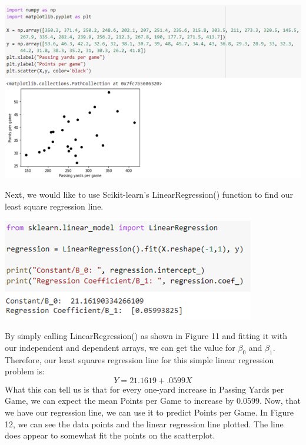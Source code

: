 \documentclass[a4paper,12pt]{report}
\begin{document}
\begin{center}
    \captionsetup{type=figure}
    \includegraphics[width=.9\linewidth]{media/scatterplotmatplot.png}
\end{center}

Next, we would like to use Scikit-learn’s LinearRegression() function to find our least square regression line.

\begin{center}
    \captionsetup{type=figure}
    \includegraphics[width=.9\linewidth]{media/sklearnregressionfit.png}
\end{center}

By simply calling LinearRegression() as shown in Figure 11 and fitting it with our independent and dependent arrays, we can get the value for $\beta_0$ and $\beta_1$. Therefore, our least squares regression line for this simple linear regression problem is:
$$Y=21.1619+.0599X$$
What this can tell us is that for every one-yard increase in Passing Yards per Game, we can expect the mean Points per Game to increase by 0.0599. Now, that we have our regression line, we can use it to predict Points per Game. In Figure 12, we can see the data points and the linear regression line plotted. The line does appear to somewhat fit the points on the scatterplot. 
\end{document}
